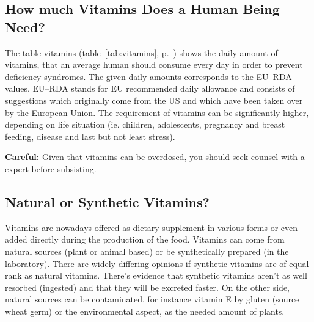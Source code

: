 \documentclass[../main.tex]{subfiles}
\begin{document}
    \subsection{How much Vitamins Does a Human Being Need?}

    The table vitamins (table~\ref{tab:vitamins}, p.~\pageref{tab:vitamins}) shows the daily amount of vitamins,
    that an average human should consume every day in order to prevent deficiency syndromes.
    The given daily amounts corresponds to the EU--RDA--values.
    EU--RDA stands for EU recommended daily allowance and consists of suggestions which originally come from the US and which
    have been taken over by the European Union.
    The requirement of vitamins can be significantly higher, depending on life situation
    (ie. children, adolescents, pregnancy and breast feeding, disease and last but not least stress).

    \textbf{Careful:} Given that vitamins can be overdosed, you should seek counsel with a expert before subsisting.

    \subsection{Natural or Synthetic Vitamins?}
    Vitamins are nowadays offered as dietary supplement in various forms or even added directly during the production of the food.
    Vitamins can come from natural sources (plant or animal based) or be synthetically prepared (in the laboratory).
    There are widely differing opinions if synthetic vitamins are of equal rank as natural vitamins.
    There's evidence that synthetic vitamins aren't as well resorbed (ingested) and that they will be excreted faster.
    On the other side, natural sources can be contaminated, for instance vitamin E by gluten (source wheat germ)
    or the environmental aspect, as the needed amount of plants.
\end{document}
